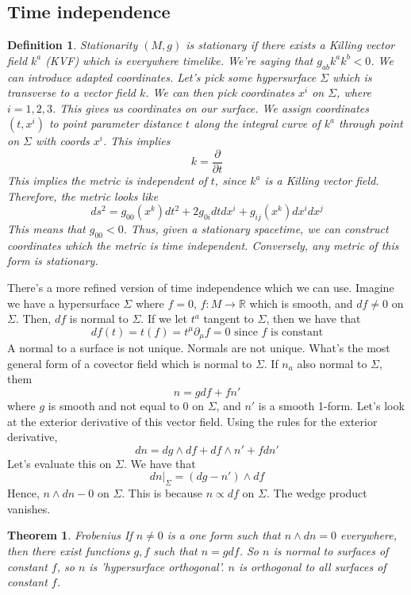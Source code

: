 \documentclass[11pt, oneside]{article}   	%
\theoremstyle{slanted}
\newtheorem*{thm}{Theorem}
\newtheorem*{defn}{Definition}
\begin{document}
\subsection{Time independence}
\begin{defn}{Stationarity}
$ \left(  M , g  \right)  $ is stationary if there exists a Killing vector field
$ k ^ a $
(KVF) which is everywhere timelike. 
We're saying that $ g _{ ab } k ^ a k ^ b < 0 $. We can introduce adapted coordinates. 
Let's pick some hypersurface $ \Sigma $ which is transverse to a vector field 
$ k $. We can then pick coordinates  $ x ^ i $ on $ \Sigma $, where $ i =  1, 2, 3 $. 
This gives us coordinates on our surface. 
We assign coordinates $ \left(  t, x ^ i  \right)  $ to point parameter 
distance $ t $ along the integral curve of  $ k ^ a $ through point on 
$ \Sigma $ with coords $ x ^ i $. This implies 
\[
 k  = \frac{\partial }{\partial t} 
\] This implies the metric is independent of $ t $, since $ k ^ a $ is a 
Killing vector field. Therefore, the metric looks like 
\[
	ds ^ 2  = g _{ 00 } \left( x ^ k  \right) dt ^ 2  + 2 
	g _{ 0i } dt d x ^ i + g _{ ij  }\left( x ^ k  \right)  dx ^ i dx ^ j 
\] This means that $ g _{ 00 } < 0 $. Thus, 
given a stationary spacetime, we can construct coordinates which 
the metric is time independent. 
Conversely, any metric of this form is stationary. 
\end{defn}
There's a more refined version of time independence which 
we can use. 
Imagine we have a hypersurface $ \Sigma $ where $ f = 0 $, $ f : M \to \mathbb{ R } $
which is smooth, and $ df \neq 0  $ on $ \Sigma $. 
Then, $ df $ is normal to $ \Sigma $. 
If we let $ t ^ a $ tangent to $ \Sigma $, then we have that 
\[
df ( t )  = t ( f )  = t ^ \mu \partial  _ \mu f = 0 \text{ since } f  \text{ is constant}
\] A normal to a surface is 
not unique. 
Normals are not unique. What's the most general 
form of a covector field which is normal to $ \Sigma $. 
If $ n _ a$  also normal to $ \Sigma $, them 
\[
n = g df + f n ' 
\] where $ g $ is smooth and not equal to $ 0 $ on $ \Sigma $,
and  $ n ' $ is a smooth 1-form. 
Let's look at the exterior 
derivative of this vector field. Using the rules 
for the exterior derivative, 
\[
dn = dg \wedge  df + df \wedge  n ' + f dn ' 
\] Let's evaluate this 
on $ \Sigma $. We have that 
\[
\left. dn \right\vert_{ \Sigma }  = \left(  dg - n '  \right)  \wedge  df
\] Hence, $ n \wedge  dn - 0 $   on $ \Sigma $. This is because 
$ n \propto df $ on $ \Sigma $. The wedge product vanishes. 
\begin{thm}{Frobenius}
If $ n \neq 0 $ is a one form such that $ n \wedge  dn  = 0 $  everywhere, 
then there exist functions $g, f $ such that 
$ n   = g df $. So $ n $ is normal 
to surfaces of constant $ f $, so 
$ n $ is 'hypersurface orthogonal'. 
$ n$ is orthogonal to all surfaces 
of constant $ f $. 
\end{thm}
\end{document}
